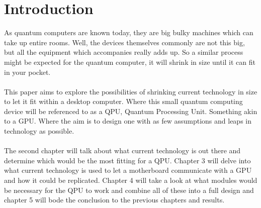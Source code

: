\section{Introduction}
\label{sec:introduction}
As quantum computers are known today, they are big bulky machines which can take up entire rooms. Well, the devices themselves commonly are not this big, but all the equipment which accompanies really adds up. So a similar process might be expected for the quantum computer, it will shrink in size until it can fit in your pocket.
\\\\
This paper aims to explore the possibilities of shrinking current technology in size to let it fit within a desktop computer. Where this small quantum computing device will be referenced to as a QPU, Quantum Processing Unit. Something akin to a GPU. Where the aim is to design one with as few assumptions and leaps in technology as possible.
\\\\
The second chapter will talk about what current technology is out there and determine which would be the most fitting for a QPU. Chapter 3 will delve into what current technology is used to let a motherboard communicate with a GPU and how it could be replicated. Chapter 4 will take a look at what modules would be necessary for the QPU to work and combine all of these into a full design and chapter 5 will bode the conclusion to the previous chapters and results.